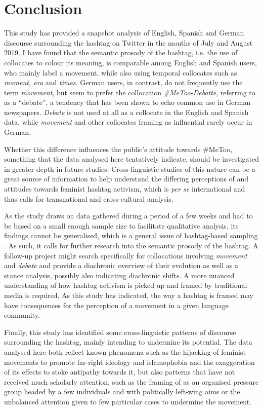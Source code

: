 \documentclass[output=paper,english,spanish,german,english]{langsci/langscibook}
\begin{document}
\section{Conclusion}

This study has provided a snapshot analysis of English, Spanish and German discourse surrounding the \mt hashtag on Twitter in the months of July and August 2019. I have found that the semantic prosody of the \mt hashtag, i.e. the use of collocates to colour its meaning, is comparable among English and Spanish users, who mainly label \mt a movement, while also using temporal collocates such as \textit{moment, era} and \textit{times}. German users, in contrast, do not frequently use the term \textit{movement}, but seem to prefer the collocation \textit{\#MeToo-Debatte}, referring to \mt as a \enquote{debate}, a tendency that has been shown to echo common use in German newspapers. \textit{Debate} is not used at all as a collocate in the English and Spanish data, while \textit{movement} and other collocates framing \mt as influential rarely occur in German.

Whether this difference influences the public's attitude towards \#MeToo, something that the data analysed here tentatively indicate, should be investigated in greater depth in future studies. Cross-linguistic studies of this nature can be a great source of information to help understand the differing perceptions of and attitudes towards feminist hashtag activism, which is \textit{per se} international and thus calls for transnational and cross-cultural analysis.

As the study draws on data gathered during a period of a few weeks and had to be based on a small enough sample size to facilitate qualitative analysis, its findings cannot be generalised, which is a general issue of hashtag-based sampling \parencite[7]{zappavigna18}. As such, it calls for further research into the semantic prosody of the \mt hashtag. A follow-up project might search specifically for collocations involving \textit{movement} and \textit{debate} and provide a diachronic overview of their evolution as well as a stance analysis, possibly also indicating diachronic shifts. A more nuanced understanding of how hashtag activism is picked up and framed by traditional media is required. As this study has indicated, the way a hashtag is framed may have consequences for the perception of a movement in a given language community.

Finally, this study has identified some cross-linguistic patterns of discourse surrounding the \mt hashtag, mainly intending to undermine its potential. The data analysed here both reflect known phenomena such as the hijacking of feminist movements to promote far-right ideology and islamophobia and the exaggeration of its effects to stoke antipathy towards it, but also patterns that have not received much scholarly attention, such as the framing of \mt as an organised pressure group headed by a few individuals and with politically left-wing aims or the unbalanced attention given to few particular cases to undermine the movement.
\end{document}
